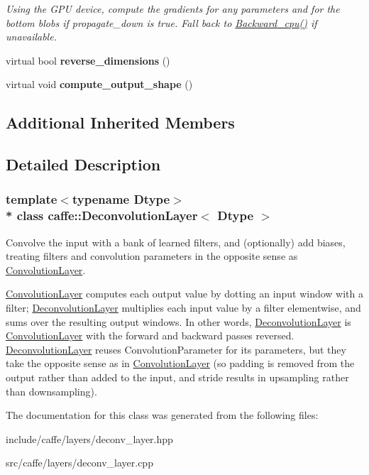 \begin{DoxyCompactItemize}
\begin{DoxyCompactList}\small\item\em Using the G\+PU device, compute the gradients for any parameters and for the bottom blobs if propagate\+\_\+down is true. Fall back to \hyperlink{classcaffe_1_1DeconvolutionLayer_a081ed64d7b91d42f9f441f849db2a58d}{Backward\+\_\+cpu()} if unavailable. \end{DoxyCompactList}\item 
virtual bool {\bfseries reverse\+\_\+dimensions} ()\hypertarget{classcaffe_1_1DeconvolutionLayer_aa71cf7a9ff4cebe12721783070f49588}{}\label{classcaffe_1_1DeconvolutionLayer_aa71cf7a9ff4cebe12721783070f49588}

\item 
virtual void {\bfseries compute\+\_\+output\+\_\+shape} ()\hypertarget{classcaffe_1_1DeconvolutionLayer_a81da6f09a0b00db0f0e1a4e5fe2cb4ee}{}\label{classcaffe_1_1DeconvolutionLayer_a81da6f09a0b00db0f0e1a4e5fe2cb4ee}

\end{DoxyCompactItemize}
\subsection*{Additional Inherited Members}


\subsection{Detailed Description}
\subsubsection*{template$<$typename Dtype$>$\\*
class caffe\+::\+Deconvolution\+Layer$<$ Dtype $>$}

Convolve the input with a bank of learned filters, and (optionally) add biases, treating filters and convolution parameters in the opposite sense as \hyperlink{classcaffe_1_1ConvolutionLayer}{Convolution\+Layer}. 

\hyperlink{classcaffe_1_1ConvolutionLayer}{Convolution\+Layer} computes each output value by dotting an input window with a filter; \hyperlink{classcaffe_1_1DeconvolutionLayer}{Deconvolution\+Layer} multiplies each input value by a filter elementwise, and sums over the resulting output windows. In other words, \hyperlink{classcaffe_1_1DeconvolutionLayer}{Deconvolution\+Layer} is \hyperlink{classcaffe_1_1ConvolutionLayer}{Convolution\+Layer} with the forward and backward passes reversed. \hyperlink{classcaffe_1_1DeconvolutionLayer}{Deconvolution\+Layer} reuses Convolution\+Parameter for its parameters, but they take the opposite sense as in \hyperlink{classcaffe_1_1ConvolutionLayer}{Convolution\+Layer} (so padding is removed from the output rather than added to the input, and stride results in upsampling rather than downsampling). 

The documentation for this class was generated from the following files\+:\begin{DoxyCompactItemize}
\item 
include/caffe/layers/deconv\+\_\+layer.\+hpp\item 
src/caffe/layers/deconv\+\_\+layer.\+cpp\end{DoxyCompactItemize}

